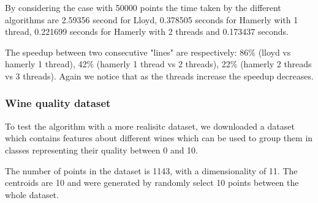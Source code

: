 \documentclass{report}
\begin{document}
\begin{minipage}[b]{0.48\textwidth}
  By considering the case with 50000 points the time taken by the different algorithms are 2.59356 second for Lloyd, 0.378505 seconds for Hamerly with 1 thread, 0.221699 seconds for Hamerly with 2 threads and 0.173437 seconds.

  The speedup between two consecutive "lines" are respectively: 86\% (lloyd vs hamerly 1 thread), 42\% (hamerly 1 thread vs 2 threads), 22\% (hamerly 2 threads vs 3 threads). Again we notice that as the threads increase the speedup decreases.

  \subsubsection*{Wine quality dataset}
  To test the algorithm with a more realisitc dataset, we downloaded a dataset which contains features about different wines which can be used to group them in classes representing their quality between 0 and 10.

  The number of points in the dataset is 1143, with a dimensionality of 11. The centroids are 10 and were generated by randomly select 10 points between the whole dataset.\\


\end{minipage}

\newpage
\end{document}
